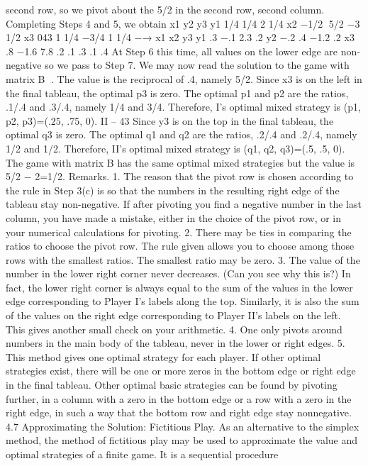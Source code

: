 second row, so we pivot about the 5/2 in the second row, second column. Completing
Steps 4 and 5, we obtain
x1 y2 y3
y1 1/4 1/4 2 1/4
x2 −1/2 5/2 −3 1/2
x3 043 1
1/4 −3/4 1 1/4
−→
x1 x2 y3
y1 .3 −.1 2.3 .2
y2 −.2 .4 −1.2 .2
x3 .8 −1.6 7.8 .2
.1 .3 .1 .4
At Step 6 this time, all values on the lower edge are non-negative so we pass to Step
7. We may now read the solution to the game with matrix B
.
The value is the reciprocal of .4, namely 5/2.
Since x3 is on the left in the final tableau, the optimal p3 is zero. The optimal p1
and p2 are the ratios, .1/.4 and .3/.4, namely 1/4 and 3/4. Therefore, I’s optimal mixed
strategy is (p1, p2, p3)=(.25, .75, 0).
II – 43
Since y3 is on the top in the final tableau, the optimal q3 is zero. The optimal q1
and q2 are the ratios, .2/.4 and .2/.4, namely 1/2 and 1/2. Therefore, II’s optimal mixed
strategy is (q1, q2, q3)=(.5, .5, 0).
The game with matrix B has the same optimal mixed strategies but the value is
5/2 − 2=1/2.
Remarks. 1. The reason that the pivot row is chosen according to the rule in Step
3(c) is so that the numbers in the resulting right edge of the tableau stay non-negative. If
after pivoting you find a negative number in the last column, you have made a mistake,
either in the choice of the pivot row, or in your numerical calculations for pivoting.
2. There may be ties in comparing the ratios to choose the pivot row. The rule given
allows you to choose among those rows with the smallest ratios. The smallest ratio may
be zero.
3. The value of the number in the lower right corner never decreases. (Can you see
why this is?) In fact, the lower right corner is always equal to the sum of the values in the
lower edge corresponding to Player I’s labels along the top. Similarly, it is also the sum
of the values on the right edge corresponding to Player II’s labels on the left. This gives
another small check on your arithmetic.
4. One only pivots around numbers in the main body of the tableau, never in the
lower or right edges.
5. This method gives one optimal strategy for each player. If other optimal strategies
exist, there will be one or more zeros in the bottom edge or right edge in the final tableau.
Other optimal basic strategies can be found by pivoting further, in a column with a zero
in the bottom edge or a row with a zero in the right edge, in such a way that the bottom
row and right edge stay nonnegative.
4.7 Approximating the Solution: Fictitious Play.
As an alternative to the simplex method, the method of fictitious play may be used to
approximate the value and optimal strategies of a finite game. It is a sequential procedure
